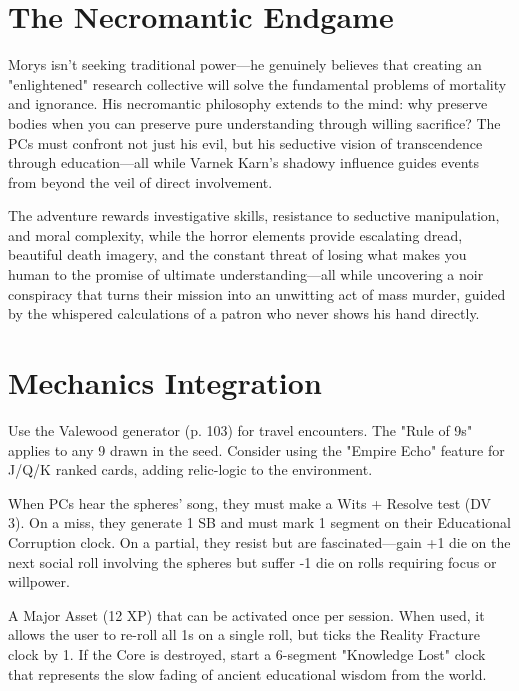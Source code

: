 \documentclass[11pt,twoside]{book}
\newenvironment{mechanicbox}[1]{%
  \begin{mdframed}[%
    linewidth=1pt,%
    linecolor=gray,%
    backgroundcolor=gray!5,%
    innertopmargin=8pt,%
    innerbottommargin=8pt,%
    innerrightmargin=8pt,%
    innerleftmargin=8pt,%
    frametitle={#1},%
    frametitlefont=\sffamily\itshape,%
  ]%
}{%
  \end{mdframed}%
}
\newcommand{\mechanic}[2]{%
  \begin{mechanicbox}{#1}
    #2
  \end{mechanicbox}
}
\begin{document}
\chapter{The Necromantic Endgame}

Morys isn't seeking traditional power---he genuinely believes that creating an "enlightened" research collective will solve the fundamental problems of mortality and ignorance. His necromantic philosophy extends to the mind: why preserve bodies when you can preserve pure understanding through willing sacrifice? The PCs must confront not just his evil, but his seductive vision of transcendence through education---all while Varnek Karn's shadowy influence guides events from beyond the veil of direct involvement.

The adventure rewards investigative skills, resistance to seductive manipulation, and moral complexity, while the horror elements provide escalating dread, beautiful death imagery, and the constant threat of losing what makes you human to the promise of ultimate understanding---all while uncovering a noir conspiracy that turns their mission into an unwitting act of mass murder, guided by the whispered calculations of a patron who never shows his hand directly.

\chapter{Mechanics Integration}

\mechanic{Travel to the Valewood}{Use the Valewood generator (p. 103) for travel encounters. The "Rule of 9s" applies to any 9 drawn in the seed. Consider using the "Empire Echo" feature for J/Q/K ranked cards, adding relic-logic to the environment.}

\mechanic{Spheres' Siren Song}{When PCs hear the spheres' song, they must make a Wits + Resolve test (DV 3). On a miss, they generate 1 SB and must mark 1 segment on their Educational Corruption clock. On a partial, they resist but are fascinated---gain +1 die on the next social roll involving the spheres but suffer -1 die on rolls requiring focus or willpower.}

\mechanic{The Curriculum Core}{A Major Asset (12 XP) that can be activated once per session. When used, it allows the user to re-roll all 1s on a single roll, but ticks the Reality Fracture clock by 1. If the Core is destroyed, start a 6-segment "Knowledge Lost" clock that represents the slow fading of ancient educational wisdom from the world.}
\end{document}
